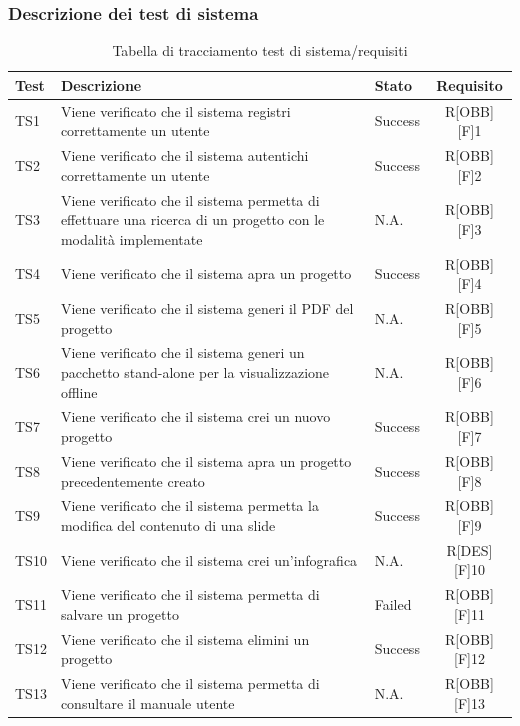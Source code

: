 \subsubsection{Descrizione dei test di sistema}
\begin{center}
	\begin{table}[h]
		\begin{tabular}{|l|p{}|l|c|}
			\toprule
			
			\textbf{Test} & \textbf{Descrizione} & \textbf{Stato} & \textbf{Requisito} \\
			
			\midrule
			TS1 & Viene verificato che il sistema registri correttamente un utente & Success & R[OBB][F]1\\ \midrule
			TS2 & Viene verificato che il sistema autentichi correttamente un utente & Success & R[OBB][F]2\\  \midrule
			TS3	& Viene verificato che il sistema permetta di effettuare una ricerca di un progetto con le modalità implementate & N.A. & R[OBB][F]3\\ \midrule
			TS4	& Viene verificato che il sistema apra un progetto & Success & R[OBB][F]4\\ \midrule
			TS5 & Viene verificato che il sistema generi il PDF del progetto & N.A. & R[OBB][F]5\\ \midrule
			TS6 & Viene verificato che il sistema generi un pacchetto stand-alone per la visualizzazione offline & N.A. & R[OBB][F]6\\ \midrule
			TS7 & Viene verificato che il sistema crei un nuovo progetto & Success & R[OBB][F]7\\ \midrule
			TS8 & Viene verificato che il sistema apra un progetto precedentemente creato & Success & R[OBB][F]8\\ \midrule
			TS9 & Viene verificato che il sistema permetta la modifica del contenuto di una \gls{slide} & Success & R[OBB][F]9\\ \midrule
			TS10 & Viene verificato che il sistema crei un'\gls{infografica} & N.A. & R[DES][F]10\\ \midrule
			TS11 & Viene verificato che il sistema permetta di salvare un progetto & Failed & R[OBB][F]11\\ \midrule
			TS12 & Viene verificato che il sistema elimini un progetto & Success & R[OBB][F]12\\ \midrule
			TS13 & Viene verificato che il sistema permetta di consultare il manuale utente & N.A. & R[OBB][F]13\\
			
						
			\bottomrule
			
		\end{tabular}
		\caption{Tabella di tracciamento test di sistema/requisiti}
		
	\end{table}
	
\end{center}


